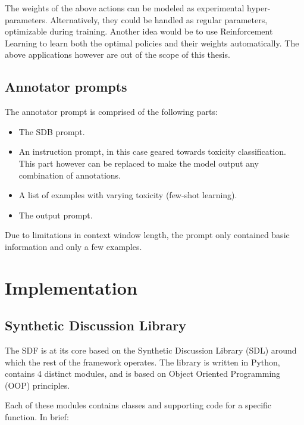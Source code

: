 The weights of the above actions can be modeled as experimental hyper-parameters. Alternatively, they could be handled as regular parameters, optimizable during training. Another idea would be to use Reinforcement Learning to learn both the optimal policies and their weights automatically. The above applications however are out of the scope of this thesis.


\subsection{Annotator prompts}
\label{ssec:system:annotator-prompt}

The annotator prompt is comprised of the following parts:

\begin{itemize}
	\item The SDB prompt.
	
	\item An instruction prompt, in this case geared towards toxicity classification. This part however can be replaced to make the model output any combination of annotations.
	
	\item A list of examples with varying toxicity (few-shot learning).
	
	\item The output prompt.
\end{itemize}

Due to limitations in context window length, the prompt only contained basic information and only a few examples.

\section{Implementation}
\label{sec:system:implementation}

\subsection{Synthetic Discussion Library}
\label{ssec:system:library}

The SDF is at its core based on the Synthetic Discussion Library (SDL) around which the rest of the framework operates. The library is written in Python, contains 4 distinct modules, and is based on Object Oriented Programming (OOP) principles.

Each of these modules contains classes and supporting code for a specific function. In brief:

